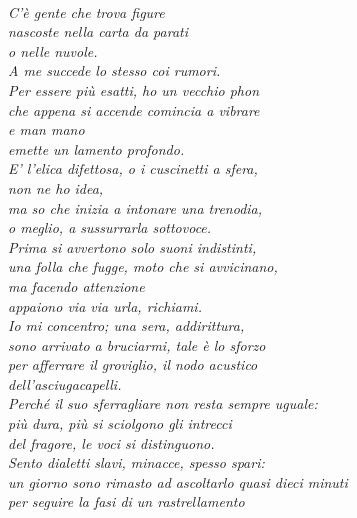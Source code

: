 
{}
\thispagestyle{empty}

~

\vfill

\begin{quoting}
\begin{flushright}
{\slshape 
C’è gente che trova figure \\
nascoste nella carta da parati \\
o nelle nuvole. \\
A me succede lo stesso coi rumori. \\
Per essere più esatti, ho un vecchio phon \\
che appena si accende comincia a vibrare \\
e man mano \\
emette un lamento profondo. \\
E’ l’elica difettosa, o i cuscinetti a sfera, \\
non ne ho idea, \\
ma so che inizia a intonare una trenodia, \\
o meglio, a sussurrarla sottovoce. \\
Prima si avvertono solo suoni indistinti, \\
una folla che fugge, moto che si avvicinano, \\
ma facendo attenzione \\
appaiono via via urla, richiami. \\
Io mi concentro; una sera, addirittura, \\
sono arrivato a bruciarmi, tale è lo sforzo \\
per afferrare il groviglio, il nodo acustico \\
dell’asciugacapelli. \\
Perché il suo sferragliare non resta sempre uguale: \\
più dura, più si sciolgono gli intrecci \\
del fragore, le voci si distinguono. \\
Sento dialetti slavi, minacce, spesso spari: \\
un giorno sono rimasto ad ascoltarlo quasi dieci minuti \\
per seguire la fasi di un rastrellamento \\
}
\end{flushright}
\end{quoting}
